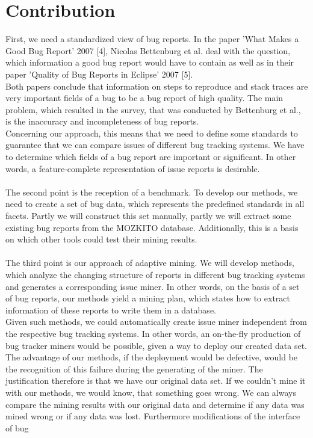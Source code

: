 \section{Contribution}
\label{Contribution}
First, we need a standardized view of bug reports. In the paper 'What Makes a Good Bug Report' 2007 [4], Nicolas Bettenburg et al. deal with the question, which information a good bug report would have to contain as well as in their paper 'Quality of Bug Reports in Eclipse' 2007 [5]. \\ Both papers conclude that information on steps to reproduce and stack traces are very important fields of a bug to be a bug report of high quality. The main problem, which resulted in the survey, that was conducted by Bettenburg et al., is the inaccuracy and incompleteness of bug reports. \\ Concerning our approach, this means that we need to define some standards to guarantee that we can compare issues of different bug tracking systems. We have to determine which fields of a bug report are important or significant. In other words, a feature-complete representation of issue reports is desirable. \\ \\ The second point is the reception of a benchmark. To develop our methods, we need to create a set of bug data, which represents the predefined standards in all facets. Partly we will construct this set manually, partly we will extract some existing bug reports from the MOZKITO database. Additionally, this is a basis on which other tools could test their mining results. \\ \\ The third point is our approach of adaptive mining. We will develop methods, which analyze the changing structure of reports in different bug tracking systems and generates a corresponding issue miner.  In other words, on the basis of a set of bug reports, our methods yield a mining plan, which states how to extract information of these reports to write them in a database. \\ Given such methods, we could automatically create issue miner independent from the respective bug tracking systems. In other words, an on-the-fly production of bug tracker miners would be possible, given a way to deploy our created data set. The advantage of our methods, if the deployment would be defective, would be the recognition of this failure during the generating of the miner. The justification therefore is that we have our original data set. If we couldn't mine it with our methods, we would know, that something goes wrong. We can always compare the mining results with our original data and determine if any data was mined wrong or if any data was lost. Furthermore modifications of the interface of bug 